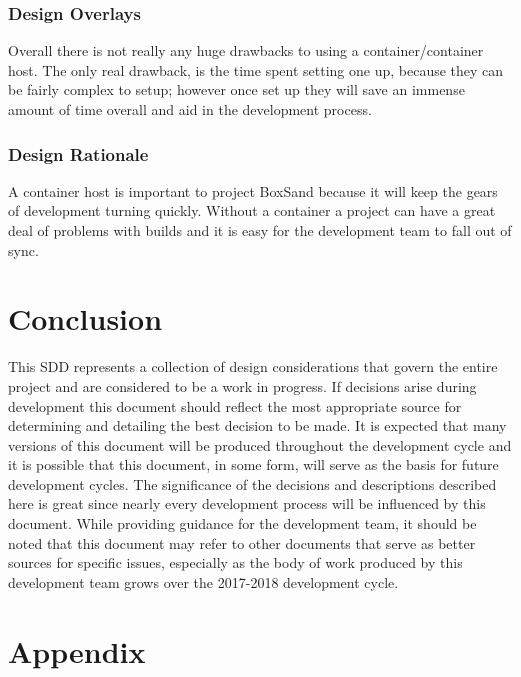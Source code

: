 \documentclass[onecolumn, draftclsnofoot,10pt, compsoc]{IEEEtran}
\begin{document}
\subsubsection{Design Overlays}
Overall there is not really any huge drawbacks to using a container/container host. The only real drawback, is the time spent setting one up, because they can be fairly complex to setup; however once set up they will save an immense amount of time overall and aid in the development process. 
\subsubsection{Design Rationale}
A container host is important to project BoxSand because it will keep the gears of development turning quickly. Without a container a project can have a great deal of problems with builds and it is easy for the development team to fall out of sync. 

\section{Conclusion}
This SDD represents a collection of design considerations that govern the entire project and are considered to be a work in progress. If decisions arise during development this document should reflect the most appropriate source for determining and detailing the best decision to be made. It is expected that many versions of this document will be produced throughout the development cycle and it is possible that this document, in some form, will serve as the basis for future development cycles. The significance of the decisions and descriptions described here is great since nearly every development process will be influenced by this document. 
While providing guidance for the development team, it should be noted that this document may refer to other documents that serve as better sources for specific issues, especially as the body of work produced by this development team grows over the 2017-2018 development cycle. 


\section{Appendix}
\end{document}
